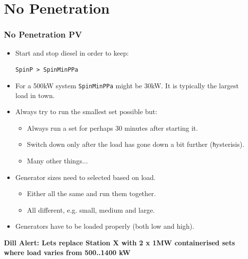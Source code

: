 \documentclass{beamer}
\def\dill#1{\textcolor{RawSienna}{\textbf{Dill Alert: #1}}}
\begin{document}
\section{No Penetration}
\begin{frame}\frametitle{No Penetration PV}
  \begin{itemize}
  \item Start and stop diesel in order to keep:
    
    \texttt{SpinP > SpinMinPPa}
  \item For a 500kW system \texttt{SpinMinPPa} might
    be 30kW. It is typically the largest load in town.  \pause
  \item Always try to run the smallest set possible but:
    \begin{itemize}
    \item Always run a set for perhaps 30 minutes after starting it.
    \item Switch down only after the load has gone down a bit further
      (\texttt hysterisis).
    \item Many other things...
    \end{itemize}
    \pause
  \item Generator sizes need to selected based on load.
    \begin{itemize}
    \item Either all the same and run them together.
    \item All different, e.g. small, medium and large.
    \end{itemize}
    \pause
  \item Generators have to be loaded properly (both low and high).
  \end{itemize}
  \pause
  \dill{Lets replace Station X with 2 x 1MW containerised sets where 
  load varies from 500..1400 kW}
\end{frame}
\end{document}

